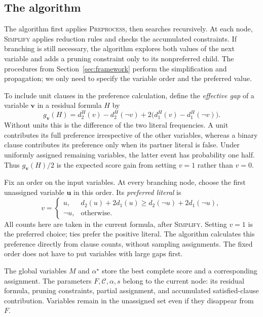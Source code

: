 \documentclass[11pt,a4paper]{article}
\theoremstyle{definition}
\theoremstyle{remark}
\begin{document}
\subsection{The algorithm}\label{sec:bias_algorithm}

The algorithm first applies \textnormal{\textsc{Preprocess}}, then searches
recursively. At each node, \textnormal{\textsc{Simplify}} applies reduction
rules and checks the accumulated constraints. If branching is still
necessary, the algorithm explores both values of the next variable and
adds a pruning constraint only to its nonpreferred child. The procedures
from Section~\ref{sec:framework} perform the simplification and propagation;
we only need to specify the variable order and the preferred value.

To include unit clauses in the preference calculation, define the
\emph{effective gap} of a variable $\mathbf v$ in a residual formula $H$ by
\begin{equation}
 g_{\mathbf v}(H)=d_2^H(v)-d_2^H(\neg v)
                    +2\bigl(d_1^H(v)-d_1^H(\neg v)\bigr).
 \label{eq:effectivegap}
\end{equation}
Without units this is the difference of the two literal frequencies.
A unit contributes its full preference irrespective of the other variables,
whereas a binary clause contributes its preference only when its partner
literal is false. Under uniformly assigned remaining variables, the latter
event has probability one half. Thus $g_{\mathbf v}(H)/2$ is the expected
score gain from setting $v=1$ rather than $v=0$.

Fix an order on the input variables. At every branching node, choose the
first unassigned variable $\mathbf u$ in this order. Its \emph{preferred
literal} is
\begin{equation}
 v=\begin{cases}
 u,&d_2(u)+2d_1(u)\ge d_2(\neg u)+2d_1(\neg u),\\
 \neg u,&\text{otherwise}.
 \end{cases}
 \label{eq:bias_preference}
\end{equation}
All counts here are taken in the current formula, after
\textnormal{\textsc{Simplify}}. Setting $v=1$ is the preferred choice;
ties prefer the positive literal. The algorithm calculates this preference
directly from clause counts, without sampling assignments. The fixed order
does not have to put variables with large gaps first.

The global variables $M$ and $\alpha^\star$ store the best complete score
and a corresponding assignment. The parameters $F,\mathcal C,\alpha,s$
belong to the current node: its residual formula, pruning constraints,
partial assignment, and accumulated satisfied-clause contribution.
Variables remain in the unassigned set even if they disappear from $F$.
\end{document}
